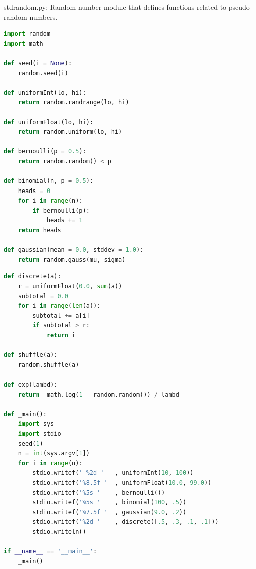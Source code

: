 \documentclass[8pt,a4paper,compress,handout]{beamer}
\begin{document}
\begin{frame}[fragile]
\begin{framed}
\tiny stdrandom.py: Random number module that defines functions related to pseudo-random numbers.
\end{framed}

\begin{lstlisting}[language=Python]
import random
import math

def seed(i = None):
    random.seed(i)

def uniformInt(lo, hi):
    return random.randrange(lo, hi)
    
def uniformFloat(lo, hi):
    return random.uniform(lo, hi)

def bernoulli(p = 0.5):
    return random.random() < p

def binomial(n, p = 0.5):
    heads = 0
    for i in range(n):
        if bernoulli(p):
            heads += 1
    return heads
    
def gaussian(mean = 0.0, stddev = 1.0):
    return random.gauss(mu, sigma)
\end{lstlisting}
\end{frame}

\begin{frame}[fragile]
\begin{lstlisting}[language=Python]
def discrete(a):
    r = uniformFloat(0.0, sum(a))
    subtotal = 0.0
    for i in range(len(a)):
        subtotal += a[i]
        if subtotal > r:
            return i

def shuffle(a):
    random.shuffle(a)

def exp(lambd):
    return -math.log(1 - random.random()) / lambd
    
def _main():
    import sys
    import stdio
    seed(1)
    n = int(sys.argv[1])
    for i in range(n):
        stdio.writef(' %2d '   , uniformInt(10, 100))
        stdio.writef('%8.5f '  , uniformFloat(10.0, 99.0))
        stdio.writef('%5s '    , bernoulli())
        stdio.writef('%5s '    , binomial(100, .5))
        stdio.writef('%7.5f '  , gaussian(9.0, .2))
        stdio.writef('%2d '    , discrete([.5, .3, .1, .1]))
        stdio.writeln()

if __name__ == '__main__':
    _main()
\end{lstlisting}
\end{frame}
\end{document}
